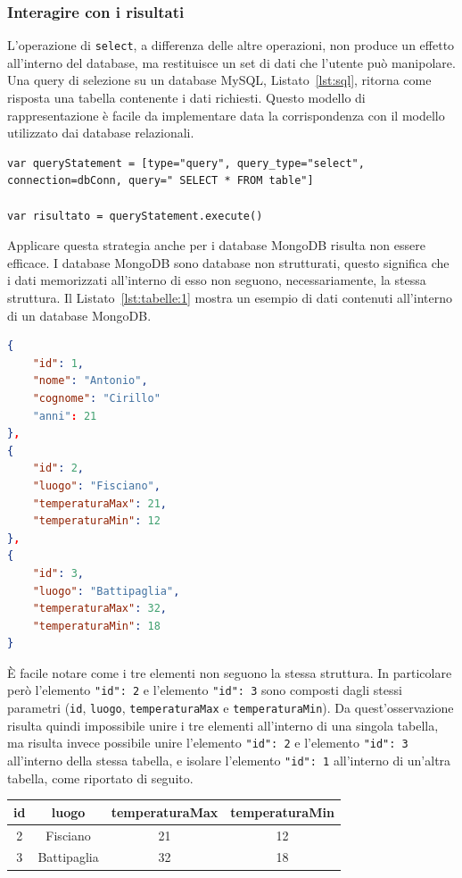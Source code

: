 \subsubsection{Interagire con i risultati}
L'operazione di \verb|select|, a differenza delle altre operazioni, non produce un effetto all'interno del database, ma restituisce un set di dati che l'utente può manipolare. Una query di selezione su un database MySQL, Listato~\ref{lst:sql}, ritorna come risposta una tabella contenente i dati richiesti. Questo modello di rappresentazione è facile da implementare data la corrispondenza con il modello utilizzato dai database relazionali. 
\begin{lstlisting}[language=FLY,caption={Dichiarazione di entità query per l’esecuzione di un’interrogazione di selezione che utilizza una stringa di testo.}, label={lst:sql}]
var queryStatement = [type="query", query_type="select", connection=dbConn, query=" SELECT * FROM table"]

var risultato = queryStatement.execute()
\end{lstlisting}
Applicare questa strategia anche per i database MongoDB risulta non essere efficace. I database MongoDB sono database non strutturati, questo significa che i dati memorizzati all'interno di esso non seguono, necessariamente, la stessa struttura. Il Listato~\ref{lst:tabelle:1} mostra un esempio di dati contenuti all'interno di un database MongoDB.
\begin{lstlisting}[language=json,caption={Esempio di elementi presenti all'interno di un database MongoDB.}, label={lst:tabelle:1}]
{
	"id": 1,
	"nome": "Antonio",
	"cognome": "Cirillo"
	"anni": 21
},
{
	"id": 2,
	"luogo": "Fisciano",
	"temperaturaMax": 21,
	"temperaturaMin": 12
},
{
	"id": 3,
	"luogo": "Battipaglia",
	"temperaturaMax": 32,
	"temperaturaMin": 18
}
\end{lstlisting}
È facile notare come i tre elementi non seguono la stessa struttura. In particolare però l'elemento \verb|"id": 2| e l'elemento \verb|"id": 3| sono composti dagli stessi parametri (\verb|id|, \verb|luogo|, \verb|temperaturaMax| e \verb|temperaturaMin|). Da quest'osservazione risulta quindi impossibile unire i tre elementi all'interno di una singola tabella, ma risulta invece possibile unire l'elemento \verb|"id": 2| e l'elemento \verb|"id": 3| all'interno della stessa tabella, e isolare l'elemento \verb|"id": 1| all'interno di un'altra tabella, come riportato di seguito. 
\begin{center}
\begin{tabular}{||c c c c||} 
 \hline
 id & luogo & temperaturaMax & temperaturaMin \\ [0.5ex] 
 \hline\hline
 2 & Fisciano & 21 & 12 \\ 
 \hline
 3 & Battipaglia & 32 & 18 \\
 \hline
\end{tabular}
\end{center}
